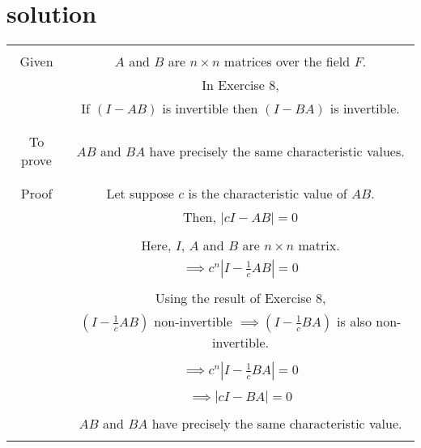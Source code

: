 \documentclass[journal,12pt,twocolumn]{IEEEtran}
\begin{document}
\section{solution}
\begin{table}[h!]
\begin{center}
\resizebox{\columnwidth}{!}
{
\begin{tabular}{|c|c|}
\hline
& \\
Given & $A$ and $B$ are $n \times n$ matrices over the field $F$.\\
& In Exercise 8,\\
& If $(I-AB)$ is invertible then $(I-BA)$ is invertible.\\
&\\
\hline
& \\
To prove & $AB$ and $BA$ have precisely the same characteristic values.\\
& \\
\hline
& \\
Proof  & Let suppose $c$ is  the characteristic value of $AB$.\\
& Then, $|cI-AB|=0$\\
& \\
& Here, $I$, $A$ and $B$ are $n \times n$ matrix.\\
& $\implies c^n|I-\frac{1}{c}AB|=0$ \\
&\\
& Using the result of Exercise $8$,\\
& $(I-\frac{1}{c}AB)$ non-invertible $\implies (I-\frac{1}{c}BA)$ is also non-invertible.\\
&\\
& $\implies c^n|I-\frac{1}{c}BA|=0$ \\
& \\
& $\implies |cI-BA|=0$\\
& \\
& $AB$ and $BA$ have precisely the same characteristic value.\\
& \\
\hline
\end{tabular}
}
\end{center}
\end{table}
\end{document}
